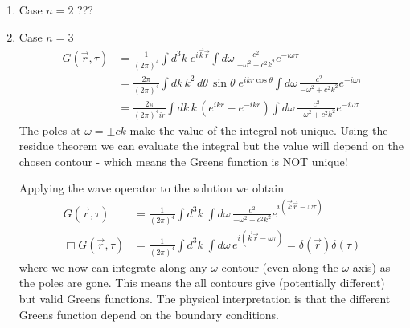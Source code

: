\documentclass[10pt,a4paper]{book}
\theoremstyle{definition}
\begin{document}
\begin{itemize}
\begin{enumerate}
\item Case $n=2$
???

\item Case $n=3$
\begin{align}
G(\vec{r},\tau)
&=\frac{1}{(2\pi)^4}\int d^3k\;e^{i\vec{k}\vec{r}} \int d\omega\,\frac{c^2}{-\omega^2+c^2k^2}e^{-i\omega\tau}\\
&=\frac{2\pi}{(2\pi)^4}\int dk\,k^2\,d\theta\,\sin\theta\;e^{ikr\cos\theta} \int d\omega\,\frac{c^2}{-\omega^2+c^2k^2}e^{-i\omega\tau}\\
&=\frac{2\pi}{(2\pi)^4ir}\int dk\,k\,(e^{ikr}-e^{-ikr}) \int d\omega\,\frac{c^2}{-\omega^2+c^2k^2}e^{-i\omega\tau}
\end{align}
The poles at $\omega=\pm ck$ make the value of the integral not  
unique. Using the residue theorem we can evaluate the integral but the value will depend on the chosen contour - which means the Greens function is NOT unique!

Applying the wave operator to the solution we obtain 
\begin{align}
G(\vec{r},\tau)&=\frac{1}{(2\pi)^4}\int d^3k\;\int d\omega\,\frac{c^2}{-\omega^2+c^2k^2}e^{i(\vec{k}\vec{r}-\omega\tau)}\\
\Box G(\vec{r},\tau)&=\frac{1}{(2\pi)^4}\int d^3k\;\int d\omega\,e^{i(\vec{k}\vec{r}-\omega\tau)}=\delta(\vec{r})\delta(\tau)
\end{align}
where we now can integrate along any $\omega$-contour (even along the $\omega$ axis) as the poles are gone. This means the all contours give (potentially different) but valid Greens functions. The physical interpretation is that the different Greens function depend on the boundary conditions.


\end{enumerate}
\end{itemize}
\end{document}
